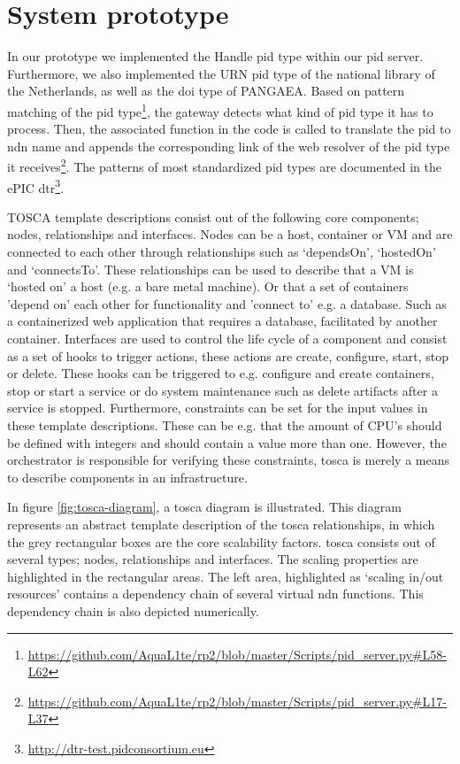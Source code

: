 \documentclass[conference]{IEEEtran}
\begin{document}
\section{System prototype}
\label{ndn-planning-deployment}

In our prototype we implemented the Handle \gls{pid} type within our \gls{pid} server. Furthermore, we also implemented the URN \gls{pid} type of the national library of the Netherlands, as well as the \gls{doi} type of PANGAEA. Based on pattern matching of the \gls{pid} type\footnote{\url{https://github.com/AquaL1te/rp2/blob/master/Scripts/pid_server.py#L58-L62}}, the gateway detects what kind of \gls{pid} type it has to process. Then, the associated function in the code is called to translate the \gls{pid} to \gls{ndn} name and appends the corresponding link of the web resolver of the \gls{pid} type it receives\footnote{\url{https://github.com/AquaL1te/rp2/blob/master/Scripts/pid_server.py#L17-L37}}. The patterns of most standardized \gls{pid} types are documented in the ePIC \gls{dtr}\footnote{\url{http://dtr-test.pidconsortium.eu}}.




TOSCA template descriptions consist out of the following core components; nodes, relationships and interfaces. Nodes can be a host, container or VM and are connected to each other through relationships such as `dependsOn', `hostedOn' and `connectsTo'. These relationships can be used to describe that a VM is `hosted on' a host (e.g. a bare metal machine). Or that a set of containers 'depend on' each other for functionality and 'connect to' e.g. a database. Such as a containerized web application that requires a database, facilitated by another container. Interfaces are used to control the life cycle of a component and consist as a set of hooks to trigger actions, these actions are create, configure, start, stop or delete. These hooks can be triggered to e.g. configure and create containers, stop or start a service or do system maintenance such as delete artifacts after a service is stopped. Furthermore, constraints can be set for the input values in these template descriptions. These can be e.g. that the amount of CPU's should be defined with integers and should contain a value more than one. However, the orchestrator is responsible for verifying these constraints, \gls{tosca} is merely a means to describe components in an infrastructure.

In figure \ref{fig:tosca-diagram}, a \gls{tosca} diagram is illustrated. This diagram represents an abstract template description of the \gls{tosca} relationships, in which the grey rectangular boxes are the core scalability factors. \gls{tosca} consists out of several types; nodes, relationships and interfaces. The scaling properties are highlighted in the rectangular areas. The left area, highlighted as `scaling in/out resources' contains a dependency chain of several virtual \gls{ndn} functions. This dependency chain is also depicted numerically.
\end{document}
